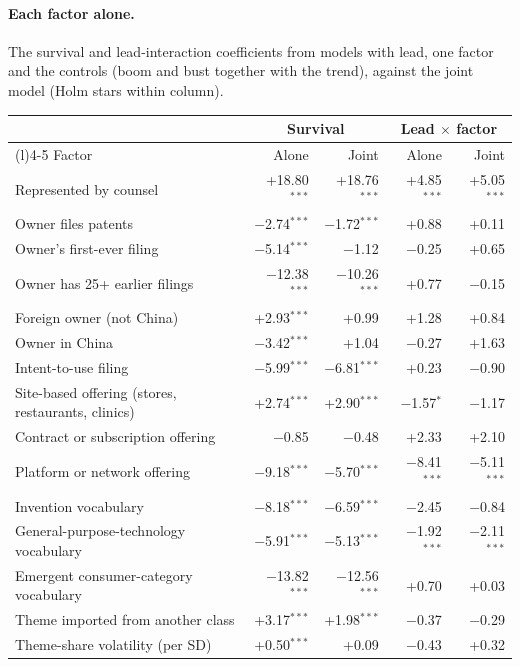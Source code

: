 \paragraph{Each factor alone.} The survival and lead-interaction coefficients from models with lead, one factor and the controls (boom and bust together with the trend), against the joint model (Holm stars within column).
{\small\begin{longtable}{>{\raggedright\arraybackslash}p{6.0cm}rrrr}
\toprule & \multicolumn{2}{c}{Survival} & \multicolumn{2}{c}{Lead $\times$ factor} \\ \cmidrule(lr){2-3}\cmidrule(l){4-5} Factor & Alone & Joint & Alone & Joint \\ \midrule \endhead
Represented by counsel & +18.80$^{***}$ & +18.76$^{***}$ & +4.85$^{***}$ & +5.05$^{***}$ \\
Owner files patents & $-$2.74$^{***}$ & $-$1.72$^{***}$ & +0.88 & +0.11 \\
Owner's first-ever filing & $-$5.14$^{***}$ & $-$1.12 & $-$0.25 & +0.65 \\
Owner has 25+ earlier filings & $-$12.38$^{***}$ & $-$10.26$^{***}$ & +0.77 & $-$0.15 \\
Foreign owner (not China) & +2.93$^{***}$ & +0.99 & +1.28 & +0.84 \\
Owner in China & $-$3.42$^{***}$ & +1.04 & $-$0.27 & +1.63 \\
Intent-to-use filing & $-$5.99$^{***}$ & $-$6.81$^{***}$ & +0.23 & $-$0.90 \\
Site-based offering (stores, restaurants, clinics) & +2.74$^{***}$ & +2.90$^{***}$ & $-$1.57$^{*}$ & $-$1.17 \\
Contract or subscription offering & $-$0.85 & $-$0.48 & +2.33 & +2.10 \\
Platform or network offering & $-$9.18$^{***}$ & $-$5.70$^{***}$ & $-$8.41$^{***}$ & $-$5.11$^{***}$ \\
Invention vocabulary & $-$8.18$^{***}$ & $-$6.59$^{***}$ & $-$2.45 & $-$0.84 \\
General-purpose-technology vocabulary & $-$5.91$^{***}$ & $-$5.13$^{***}$ & $-$1.92$^{***}$ & $-$2.11$^{***}$ \\
Emergent consumer-category vocabulary & $-$13.82$^{***}$ & $-$12.56$^{***}$ & +0.70 & +0.03 \\
Theme imported from another class & +3.17$^{***}$ & +1.98$^{***}$ & $-$0.37 & $-$0.29 \\
Theme-share volatility (per SD) & +0.50$^{***}$ & +0.09 & $-$0.43 & +0.32 \\

\end{longtable}}
